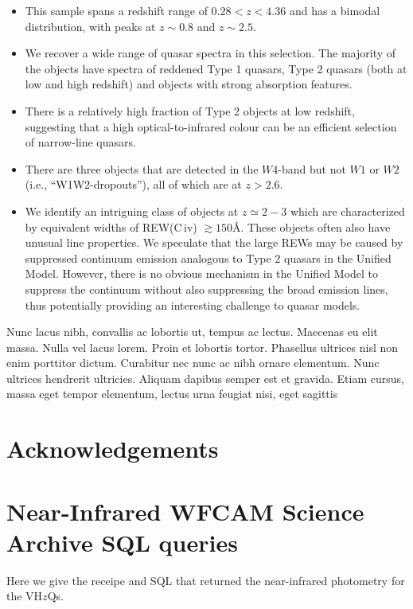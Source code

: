 \documentclass[usenatbib]{mnras}
\begin{document}
\begin{itemize}
    \item{This sample spans a redshift range of $0.28 < z < 4.36$ and has a bimodal distribution, with peaks 
        at $z\sim0.8$ and $z\sim2.5$.}
   \item{We recover a wide range of quasar spectra in this selection.  
        The majority of the objects have spectra of reddened Type 1
        quasars, Type 2 quasars (both at low and high redshift) and objects
        with strong absorption features.} 
    \item{There is a relatively high fraction of Type 2 objects at low redshift,
        suggesting that a high optical-to-infrared colour can be an efficient
        selection of narrow-line quasars.}
    \item{There are three objects that are detected in the $W4$-band but
        not $W1$ or $W2$ (i.e., ``W1W2-dropouts''), all of which are at
        $z>2.6$.}
    \item{We identify an intriguing class of objects at $z\simeq 2-3$ which are
        characterized by equivalent widths of REW(C\,{\sc iv})
        $\gtrsim150$\AA.  These objects often also have unusual line
        properties.  We speculate that the large REWs may be caused by
        suppressed continuum emission analogous to Type 2 quasars in the
        Unified Model. However, there is no obvious mechanism in the Unified
        Model to suppress the continuum without also suppressing the broad
        emission lines, thus potentially providing an interesting challenge to
        quasar models.} 
\end{itemize}
Nunc lacus nibh, convallis ac lobortis ut, tempus ac lectus. Maecenas
eu elit massa. Nulla vel lacus lorem. Proin et lobortis
tortor. Phasellus ultrices nisl non enim porttitor dictum. Curabitur
nec nunc ac nibh ornare elementum. Nunc ultrices hendrerit
ultricies. Aliquam dapibus semper est et gravida. Etiam cursus, massa
eget tempor elementum, lectus urna feugiat nisi, eget sagittis


\section*{Acknowledgements}

\newpage

\appendix
\section{Near-Infrared WFCAM Science Archive SQL queries}\label{sec:SQL}
Here we give the receipe and SQL that returned the near-infrared photometry 
for the VH$z$Qs. 
\end{document}
